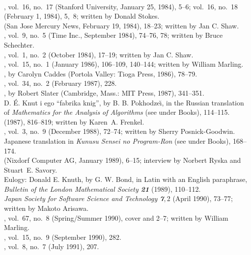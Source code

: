 \\, vol.\ 16, no.\ 17 (Stanford University,
 January 25, 1984), 5--6; vol.~16, no.~18 (February 1, 1984), 5,~8;
 written by Donald Stokes.
\\ (San Jose Mercury News, February 19, 1984), 18--23;
 written by Jan C. Shaw.
\\, vol.\ 9, no.\ 5 (Time Inc., September 1984), 74--76,
 78; written by Bruce Schechter.
\\, vol.\ 1, no.\ 2 (October 1984), 17--19;
 written by Jan C. Shaw.
\\, vol.\ 15, no.\ 1 (January 1986), 106--109, 140--144;
 written by William Marling.
\\, by Carolyn Caddes (Portola Valley:
 Tioga Press, 1986), 78--79.
\\, vol.~34, no.~2 (February
 1987), 228.
\\, by Robert Slater (Cambridge, Mass.:
 MIT Press, 1987), 341--351.
\\D. \'E. Knut i ego ``fabrika knig'', by B. B. Pokhodze\u\i, in the
 Russian translation of {\sl Mathematics for the Analysis of Algorithms\/}
 (see under Books), 114--115.
\\ (1987), 816--819; written
 by Karen~A. Frenkel.
\\, vol.\ 3, no.\ 9 (December 1988), 72--74; written
 by Sherry Posnick-Goodwin.
  Japanese translation in {\sl Kunusu Sensei no Program-Ron\/} (see
  under Books), 168--174.
\\ (Nixdorf Computer AG, January 1989),
 6--15; interview by Norbert Ryska and Stuart~E. Savory.
\\Eulogy: Donald E. Knuth, by G. W. Bond, in Latin with an English paraphrase,
 {\sl Bulletin of the London Mathematical Society\/ \bf21} (1989), 110--112.
\\{\sl Japan Society for Software Science and Technology\/ \bf7},\,2 (April
 1990), 73--77; written by Makoto Arisawa.
\\, vol.\ 67, no.\ 8 (Spring/Summer 1990), cover and
 2--7; written by William Marling.
\\, vol.~15, no.~9 (September 1990), 282.
\\, vol.~8, no.~7 (July 1991), 207.
